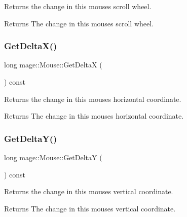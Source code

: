 Returns the change in this mouse\textquotesingle{}s scroll wheel.

\begin{DoxyReturn}{Returns}
The change in this mouse\textquotesingle{}s scroll wheel. 
\end{DoxyReturn}
\hypertarget{classmage_1_1_mouse_a137313b065314d98c7b61eaefce6c3d1}{}\label{classmage_1_1_mouse_a137313b065314d98c7b61eaefce6c3d1} 
\subsubsection{\texorpdfstring{Get\+Delta\+X()}{GetDeltaX()}}
{\footnotesize\ttfamily long mage\+::\+Mouse\+::\+Get\+DeltaX (\begin{DoxyParamCaption}{ }\end{DoxyParamCaption}) const}

Returns the change in this mouse\textquotesingle{}s horizontal coordinate.

\begin{DoxyReturn}{Returns}
The change in this mouse\textquotesingle{}s horizontal coordinate. 
\end{DoxyReturn}
\hypertarget{classmage_1_1_mouse_af0769d0f7658b0699cf5b4f797163510}{}\label{classmage_1_1_mouse_af0769d0f7658b0699cf5b4f797163510} 
\subsubsection{\texorpdfstring{Get\+Delta\+Y()}{GetDeltaY()}}
{\footnotesize\ttfamily long mage\+::\+Mouse\+::\+Get\+DeltaY (\begin{DoxyParamCaption}{ }\end{DoxyParamCaption}) const}

Returns the change in this mouse\textquotesingle{}s vertical coordinate.

\begin{DoxyReturn}{Returns}
The change in this mouse\textquotesingle{}s vertical coordinate. 
\end{DoxyReturn}
\hypertarget{classmage_1_1_mouse_a9c8d4493c86685b259819b5995a17c7a}{}\label{classmage_1_1_mouse_a9c8d4493c86685b259819b5995a17c7a} 
